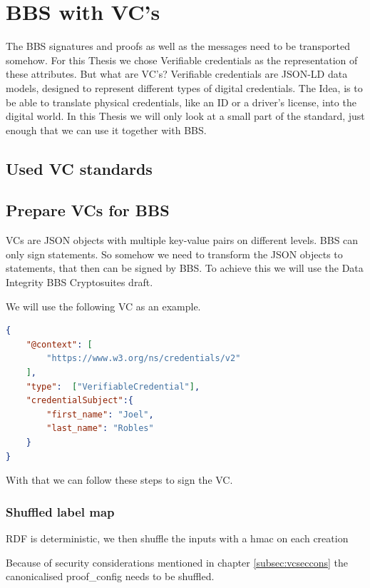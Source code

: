 \documentclass[
	a4paper               %
	,bibliography=totoc   %
	,listof=totoc         %
	,monolingual
	twoside=false,
]{bfhthesis}              %
\begin{document}
\section{BBS with VC's}
The BBS signatures and proofs as well as the messages need to be transported somehow.
For this Thesis we chose Verifiable credentials \cite{verifiable-credentials} as the representation of these attributes.
But what are VC's? \newline
Verifiable credentials are JSON-LD data models, designed to represent different types of digital credentials.
The Idea, is to be able to translate physical credentials, like an ID or a driver's license, into the digital world.
In this Thesis we will only look at a small part of the standard, just enough that we can use it together with BBS.

\subsection{Used VC standards}

\subsection{Prepare VCs for BBS}
VCs are JSON objects with multiple key-value pairs on different levels.
BBS can only sign statements.
So somehow we need to transform the JSON objects to statements, that then can be signed by BBS.
To achieve this we will use the Data Integrity BBS Cryptosuites draft\cite{bbsvc}.

We will use the following VC as an example.
\begin{lstlisting}[language=json,firstnumber=1,caption={Example VC},captionpos=b]
{
	"@context": [
		"https://www.w3.org/ns/credentials/v2"
	],
	"type":  ["VerifiableCredential"],
	"credentialSubject":{
		"first_name": "Joel",
		"last_name": "Robles"
	}
}
\end{lstlisting}

With that we can follow these steps to sign the VC.

\subsubsection{Shuffled label map}
\label{sub:shuffledlabelmap}

RDF is deterministic, we then shuffle the inputs with a hmac on each creation

Because of security considerations mentioned in chapter \ref{subsec:vcseccons} the canonicalised proof\_config needs to be shuffled.
\end{document}
